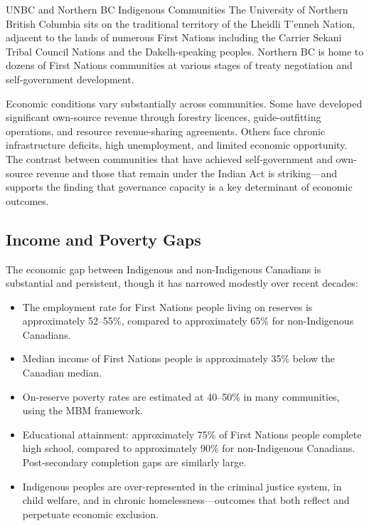 \begin{canexample}{UNBC and Northern BC Indigenous Communities}
The University of Northern British Columbia sits on the traditional territory of the
Lheidli T'enneh Nation, adjacent to the lands of numerous First Nations including the
Carrier Sekani Tribal Council Nations and the Dakelh-speaking peoples. Northern BC
is home to dozens of First Nations communities at various stages of treaty negotiation
and self-government development.

Economic conditions vary substantially across communities. Some have developed significant
own-source revenue through forestry licences, guide-outfitting operations, and
resource revenue-sharing agreements. Others face chronic infrastructure deficits,
high unemployment, and limited economic opportunity. The contrast between communities
that have achieved self-government and own-source revenue and those that remain under
the Indian Act is striking---and supports the finding that governance capacity is a
key determinant of economic outcomes.
\end{canexample}

\subsection{Income and Poverty Gaps}

The economic gap between Indigenous and non-Indigenous Canadians is substantial and persistent, though it has narrowed modestly over recent decades:

\begin{itemize}
  \item The employment rate for First Nations people living on reserves is approximately 52--55\%, compared to approximately 65\% for non-Indigenous Canadians.
  \item Median income of First Nations people is approximately 35\% below the Canadian median.
  \item On-reserve poverty rates are estimated at 40--50\% in many communities, using the MBM framework.
  \item Educational attainment: approximately 75\% of First Nations people complete high school, compared to approximately 90\% for non-Indigenous Canadians. Post-secondary completion gaps are similarly large.
  \item Indigenous peoples are over-represented in the criminal justice system, in child welfare, and in chronic homelessness---outcomes that both reflect and perpetuate economic exclusion.
\end{itemize}

